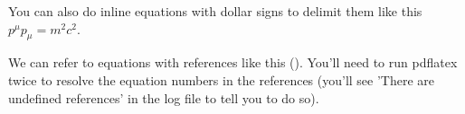 \documentclass{article}
\begin{document}
You can also do inline equations with dollar signs to delimit them like this $p^\mu p_\mu = m^2 c^2$.

We can refer to equations with references like this ().  You'll need to run pdflatex twice to resolve the equation numbers in the references (you'll see 'There are undefined references' in the log file to tell you to do so).
\end{document}
